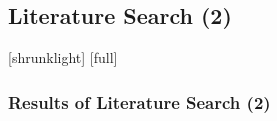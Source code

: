 \documentclass[12pt,compress,aspectratio=169]{beamer} %
\begin{document}
\subsection{Literature Search (2)}
[shrunklight]
[full]
\begin{frame}
	\frametitle{Results of Literature Search (2)}
	\centering
	\begin{table}
	\begin{center}
	\end{center}
	\end{table}
\end{frame}
\end{document}
